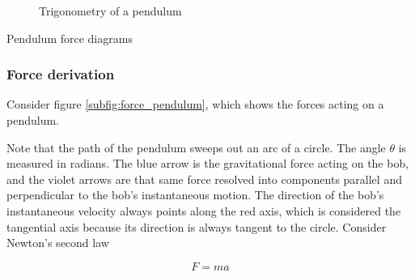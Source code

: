 \begin{bookfigure}
\begin{subfigure}{0.5\textwidth}
    \caption{Trigonometry of a pendulum}
    \label{subfig:trig_pendulum}
  \end{subfigure}
  \caption{Pendulum force diagrams}
\end{bookfigure}

\subsubsection{Force derivation}

Consider figure \ref{subfig:force_pendulum}, which shows the forces acting on a
pendulum.

Note that the path of the pendulum sweeps out an arc of a circle. The angle
$\theta$ is measured in radians. The blue arrow is the gravitational force
acting on the bob, and the violet arrows are that same force resolved into
components parallel and perpendicular to the bob's instantaneous motion. The
direction of the bob's instantaneous velocity always points along the red axis,
which is considered the tangential axis because its direction is always tangent
to the circle. Consider Newton's second law

\begin{equation*}
  F = ma
\end{equation*}

